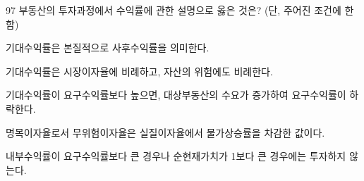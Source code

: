 \begin{question}{97}
부동산의 투자과정에서 수익률에 관한 설명으로 옳은 것은? (단, 주어진 조건에 한함)
\begin{choices}
  \item 기대수익률은 본질적으로 사후수익률을 의미한다.
  \item 기대수익률은 시장이자율에 비례하고, 자산의 위험에도 비례한다.
  \item 기대수익률이 요구수익률보다 높으면, 대상부동산의 수요가 증가하여 요구수익률이 하락한다.
  \item 명목이자율로서 무위험이자율은 실질이자율에서 물가상승률을 차감한 값이다.
  \item 내부수익률이 요구수익률보다 큰 경우나 순현재가치가 1보다 큰 경우에는 투자하지 않는다.
\end{choices}
\end{question}
